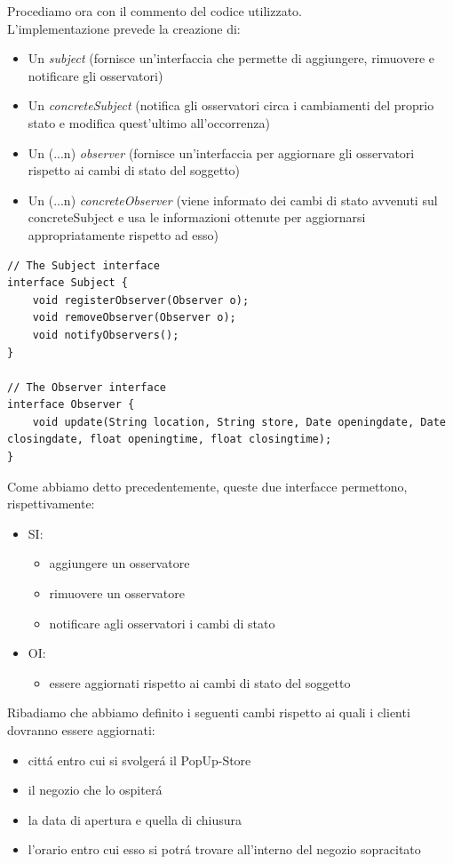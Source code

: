 \documentclass[12pt]{article}
\begin{document}
Procediamo ora con il commento del codice utilizzato. \\
L'implementazione prevede la creazione di:
\begin{itemize}
    \item Un \textit{subject} (fornisce un'interfaccia che permette di aggiungere, rimuovere e notificare gli osservatori)
    \item Un \textit{concreteSubject} (notifica gli osservatori circa i cambiamenti del proprio stato e modifica quest'ultimo all'occorrenza)
    \item Un (...n) \textit{observer} (fornisce un'interfaccia per aggiornare gli osservatori rispetto ai cambi di stato del soggetto)
    \item Un (...n) \textit{concreteObserver} (viene informato dei cambi di stato avvenuti sul concreteSubject e usa le informazioni ottenute per aggiornarsi appropriatamente rispetto ad esso)
\end{itemize}

\begin{lstlisting}
// The Subject interface 
interface Subject {
    void registerObserver(Observer o); 
    void removeObserver(Observer o); 
    void notifyObservers();
}

// The Observer interface 
interface Observer {
    void update(String location, String store, Date openingdate, Date closingdate, float openingtime, float closingtime); 
}
\end{lstlisting}

Come abbiamo detto precedentemente, queste due interfacce permettono, rispettivamente:
\begin{itemize}
    \item SI:
        \begin{itemize}
        \item aggiungere un osservatore 
        \item rimuovere un osservatore 
        \item notificare agli osservatori i cambi di stato
        \end{itemize}
    \item OI:
        \begin{itemize}
        \item essere aggiornati rispetto ai cambi di stato del soggetto
        \end{itemize}
\end{itemize}

Ribadiamo che abbiamo definito i seguenti cambi rispetto ai quali i clienti dovranno essere aggiornati:
\begin{itemize}
    \item citt\'a entro cui si svolger\'a il PopUp-Store 
    \item il negozio che lo ospiter\'a
    \item la data di apertura e quella di chiusura
    \item l'orario entro cui esso si potr\'a trovare all'interno del negozio sopracitato
\end{itemize}
\end{document}
